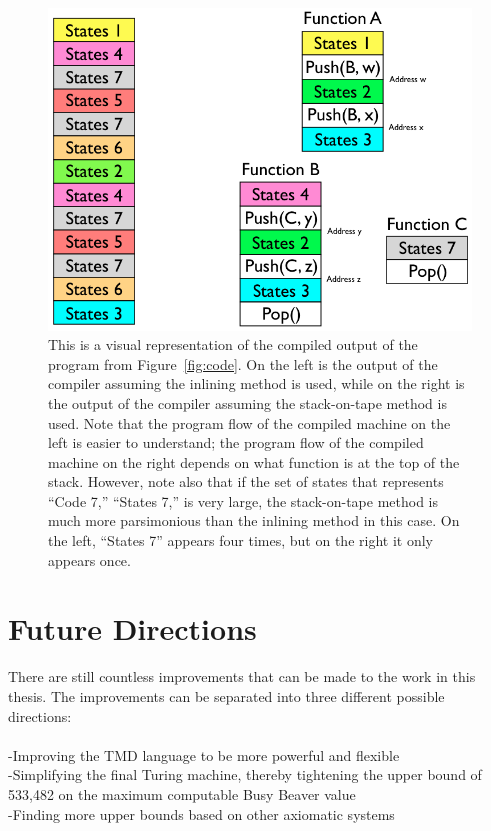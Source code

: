 \documentclass{report}
\newcommand{\statenum}{533,482 }
\begin{document}
\begin{figure} 
\begin{center} 
\includegraphics[scale=0.6]{figs/compiled.png} 
\caption{This is a visual representation of the compiled output of the program from Figure~\ref{fig:code}. On the left is the output of the compiler assuming the inlining method is used, while on the right is the output of the compiler assuming the stack-on-tape method is used. Note that the program flow of the compiled machine on the left is easier to understand; the program flow of the compiled machine on the right depends on what function is at the top of the stack. However, note also that if the set of states that represents ``Code 7,'' ``States 7,'' is very large, the stack-on-tape method is much more parsimonious than the inlining method in this case. On the left, ``States 7'' appears four times, but on the right it only appears once. \label{fig:compiled}} 
\end{center} 
\end{figure}

\section{Future Directions}

There are still countless improvements that can be made to the work in this thesis. The improvements can be separated into three different possible directions:  \\ \\
-Improving the TMD language to be more powerful and flexible \\
-Simplifying the final Turing machine, thereby tightening the upper bound of \statenum on the maximum computable Busy Beaver value \\
-Finding more upper bounds based on other axiomatic systems \\
\end{document}

